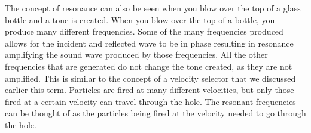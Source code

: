 \documentclass[11pt,twoside]{article}
\begin{document}
The concept of resonance can also be seen when you blow over the top of a glass bottle and a tone is created. When you blow over the top of a bottle, you produce many different frequencies. Some of the many frequencies produced allows for the incident and reflected wave to be in phase resulting in resonance amplifying the sound wave produced by those frequencies. All the other frequencies that are generated do not change the tone created, as they are not amplified. This is similar to the concept of a velocity selector that we discussed earlier this term. Particles are fired at many different velocities, but only those fired at a certain velocity can travel through the hole. The resonant frequencies can be thought of as the particles being fired at the velocity needed to go through the hole.
\end{document}

